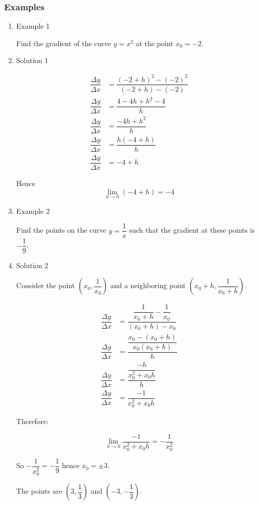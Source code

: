 \documentclass[11pt]{article}
\begin{document}
\subsubsection{Examples}
\label{sec:orgf7b4a1f}
\begin{enumerate}
\item Example 1
\label{sec:orgda5591e}

Find the gradient of the curve \(y = x^2\) at the point \(x_0 = -2\).

\item Solution 1
\label{sec:orgfc2d898}


\begin{align*}
\dfrac{\Delta y}{\Delta x} &= \dfrac{(-2+h)^2-(-2)^2}{(-2+h)-(-2)}\\
\dfrac{\Delta y}{\Delta x} &= \dfrac{4-4h+h^2-4}{h}\\
\dfrac{\Delta y}{\Delta x} &= \dfrac{-4h+h^2}{h}\\
\dfrac{\Delta y}{\Delta x} &= \dfrac{h(-4+h)}{h}\\
\dfrac{\Delta y}{\Delta x} &= -4+h
\end{align*}


Hence \[\lim_{h\to 0} (-4+h) = -4\]



\item Example 2
\label{sec:orge653c89}

Find the points on the curve \(y = \dfrac{1}{x}\) such that the
gradient at these points is \(-\dfrac{1}{9}\).

\item Solution 2
\label{sec:org881f60d}

Consider the point \(\left(x_0, \dfrac{1}{x_0}\right)\) and a
neighboring point \(\left(x_0 + h, \dfrac{1}{x_0 + h}\right)\).



\begin{align*}
\dfrac{\Delta y}{\Delta x} &= \dfrac{\dfrac{1}{x_0 + h}-\dfrac{1}{x_0}}{(x_0+h)-x_0}\\
\dfrac{\Delta y}{\Delta x} &= \dfrac{\dfrac{x_0-(x_0+h)}{x_0(x_0+h)}}{h}\\
\dfrac{\Delta y}{\Delta x} &= \dfrac{\dfrac{-h}{x_0^2+x_0h}}{h}\\
\dfrac{\Delta y}{\Delta x} &= \dfrac{-1}{x_0^2+x_0h}
\end{align*}


Therefore:

\[\lim_{h\to 0} \dfrac{-1}{x_0^2+x_0h} = -\dfrac{1}{x_0^2}\]

So \(-\dfrac{1}{x_0^2} = -\dfrac{1}{9}\) hence \(x_0 = \pm 3\).

The points are \(\left(3, \dfrac{1}{3}\right)\) and \(\left(-3,
     -\dfrac{1}{3}\right)\).
\end{enumerate}
\end{document}
